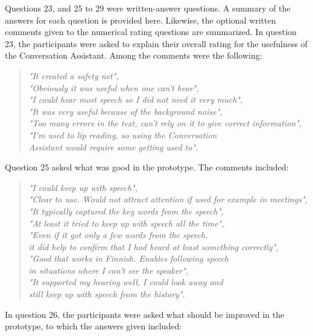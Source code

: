 \documentclass[english, 12pt, a4paper, pdftex, elec, utf8]{aaltothesis}
\renewcommand{\baselinestretch}{1.02}
\begin{document}
Questions 23, and 25 to 29 were written-answer questions. A summary of the answers for each question is provided here. Likewise, the optional written comments given to the numerical rating questions are summarized. In question 23, the participants were asked to explain their overall rating for the usefulness of the Conversation Assistant. Among the comments were the following:
\begin{quote}
	\centering
	\renewcommand{\baselinestretch}{1.5}
	\textit{
	"It created a safety net", \\
	"Obviously it was useful when one can't hear", \\
	"I could hear most speech so I did not need it very much", \\
	"It was very useful because of the background noise", \\
	"Too many errors in the text, can't rely on it to give correct information", \\
	"I'm used to lip reading, so using the Conversation \\ Assistant would require some getting used to".}
\end{quote}
\vspace{2mm}
Question 25 asked what was good in the prototype. The comments included:
\begin{quote}
	\centering
	\renewcommand{\baselinestretch}{1.5}
	\textit{
		"I could keep up with speech", \\
		"Clear to use. Would not attract attention if used for example in meetings", \\
		"It typically captured the key words from the speech", \\
		"At least it tried to keep up with speech all the time", \\
		"Even if it got only a few words from the speech, \\ \vspace{-2.5mm} it did help to confirm that I had heard at least something correctly", \\
		"Good that works in Finnish. Enables following speech \\ \vspace{-2.5mm} in situations where I can't see the speaker", \\
		"It supported my hearing well, I could look away and \\ still keep up with speech from the history".}
\end{quote}
\vspace{2mm}
In question 26, the participants were asked what should be improved in the prototype, to which the answers given included:
\end{document}
